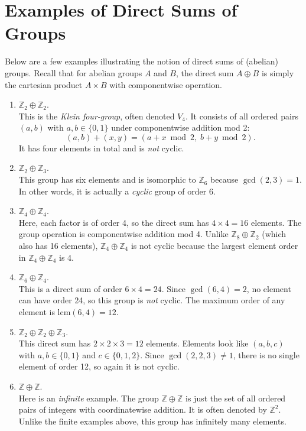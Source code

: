 \documentclass[12pt]{article}
\theoremstyle{definition} %
\theoremstyle{plain} %
\begin{document}
\section*{Examples of Direct Sums of Groups}

Below are a few examples illustrating the notion of direct sums of (abelian) groups. 
Recall that for abelian groups \(A\) and \(B\), the direct sum \(A \oplus B\) is simply 
the cartesian product \(A \times B\) with componentwise operation.

\begin{enumerate}
  \item \(\mathbb{Z}_2 \oplus \mathbb{Z}_2\).\\
    This is the \emph{Klein four-group}, often denoted \(V_4\). It consists of 
    all ordered pairs \((a,b)\) with \(a,b \in \{0,1\}\) under componentwise addition mod 2:
    \[
      (a,b) + (x,y) = (a+x \bmod 2,\; b+y \bmod 2).
    \]
    It has four elements in total and is \emph{not} cyclic.

  \item \(\mathbb{Z}_2 \oplus \mathbb{Z}_3\).\\
    This group has six elements and is isomorphic to \(\mathbb{Z}_6\) because 
    \(\gcd(2,3) = 1\). In other words, it is actually a \emph{cyclic} group of order 6.

  \item \(\mathbb{Z}_4 \oplus \mathbb{Z}_4\).\\
    Here, each factor is of order 4, so the direct sum has \(4 \times 4 = 16\) elements. 
    The group operation is componentwise addition mod 4. Unlike \(\mathbb{Z}_8 \oplus \mathbb{Z}_2\) (which also has 16 elements), 
    \(\mathbb{Z}_4 \oplus \mathbb{Z}_4\) is not cyclic because the largest element order 
    in \(\mathbb{Z}_4 \oplus \mathbb{Z}_4\) is 4. 

  \item \(\mathbb{Z}_6 \oplus \mathbb{Z}_4\).\\
    This is a direct sum of order \(6 \times 4 = 24\). Since \(\gcd(6,4) = 2\), no element can have order 
    24, so this group is \emph{not} cyclic. The maximum order of any element is 
    \(\mathrm{lcm}(6,4) = 12\).

  \item \(\mathbb{Z}_2 \oplus \mathbb{Z}_2 \oplus \mathbb{Z}_3\).\\
    This direct sum has \(2 \times 2 \times 3 = 12\) elements. Elements look like 
    \((a,b,c)\) with \(a,b \in \{0,1\}\) and \(c \in \{0,1,2\}\). Since \(\gcd(2,2,3)\neq 1\),
    there is no single element of order 12, so again it is not cyclic.

  \item \(\mathbb{Z} \oplus \mathbb{Z}\).\\
    Here is an \emph{infinite} example. The group \(\mathbb{Z} \oplus \mathbb{Z}\) is 
    just the set of all ordered pairs of integers with coordinatewise addition. 
    It is often denoted by \(\mathbb{Z}^2\). Unlike the finite examples above, 
    this group has infinitely many elements. 
\end{enumerate}
\end{document}
